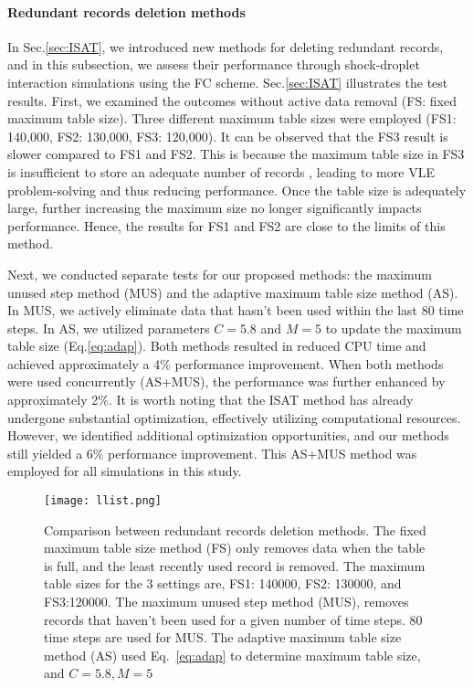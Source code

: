 \paragraph{Redundant records deletion methods}
\label{sec:delete}
In Sec.\ref{sec:ISAT}, we introduced new methods for deleting redundant records, and in this subsection, we assess their performance through shock-droplet interaction simulations using the FC scheme. Sec.\ref{sec:ISAT} illustrates the test results. First, we examined the outcomes without active data removal (FS: fixed maximum table size). Three different maximum table sizes were employed (FS1: 140,000, FS2: 130,000, FS3: 120,000). It can be observed that the FS3 result is slower compared to FS1 and FS2. This is because the maximum table size in FS3 is insufficient to store an adequate number of records , leading to more VLE problem-solving and thus reducing performance. Once the table size is adequately large, further increasing the maximum size no longer significantly impacts performance. Hence, the results for FS1 and FS2 are close to the limits of this method.

Next, we conducted separate tests for our proposed methods: the maximum unused step method (MUS) and the adaptive maximum table size method (AS). In MUS, we actively eliminate data that hasn't been used within the last 80 time steps. In AS, we utilized parameters $C = 5.8$ and $M = 5$ to update the maximum table size (Eq.\ref{eq:adap}). Both methods resulted in reduced CPU time and achieved approximately a 4\% performance improvement. When both methods were used concurrently (AS+MUS), the performance was further enhanced by approximately 2\%. It is worth noting that the ISAT method has already undergone substantial optimization, effectively utilizing computational resources. However, we identified additional optimization opportunities, and our methods still yielded a 6\% performance improvement. This AS+MUS method was employed for all simulations in this study.


\begin{figure}[htbp]
	\centering
	\texttt{[image: llist.png]}
	\caption{Comparison between redundant records deletion methods. The fixed maximum table size method (FS) only removes data when the table is full, and the least recently used record is removed. The maximum table sizes for the 3 settings are, FS1: 140000, FS2: 130000, and FS3:120000. The maximum unused step method (MUS), removes records that haven't been used for a given number of time steps. 80 time steps are used for MUS. The adaptive maximum table size method (AS) used Eq.~\ref{eq:adap} to determine maximum table size, and $C=5.8, M=5$}
	\label{droplet_delete}
\end{figure}

